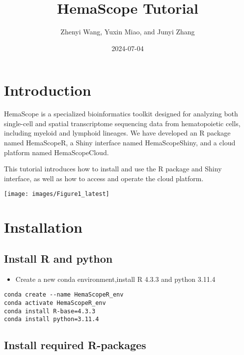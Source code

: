 \documentclass[
]{book}
\title{HemaScope Tutorial}
\author{Zhenyi Wang, Yuxin Miao, and Junyi Zhang}
\date{2024-07-04}
\providecommand{\tightlist}{%
  \setlength{\itemsep}{0pt}\setlength{\parskip}{0pt}}
\begin{document}
\maketitle

{
\setcounter{tocdepth}{1}
\tableofcontents
}
\hypertarget{introduction}{%
\chapter{Introduction}\label{introduction}}

HemaScope is a specialized bioinformatics toolkit designed for analyzing both single-cell and spatial transcriptome sequencing data from hematopoietic cells, including myeloid and lymphoid lineages. We have developed an R package named HemaScopeR, a Shiny interface named HemaScopeShiny, and a cloud platform named HemaScopeCloud.

This tutorial introduces how to install and use the R package and Shiny interface, as well as how to access and operate the cloud platform.

\texttt{[image: images/Figure1\_latest]}

\hypertarget{installation}{%
\chapter{Installation}\label{installation}}

\hypertarget{install-r-and-python}{%
\section{Install R and python}\label{install-r-and-python}}

\begin{itemize}
\tightlist
\item
  Create a new conda environment,install R 4.3.3 and python 3.11.4
\end{itemize}

\begin{verbatim}
conda create --name HemaScopeR_env
conda activate HemaScopeR_env
conda install R-base=4.3.3
conda install python=3.11.4
\end{verbatim}

\hypertarget{install-required-r-packages}{%
\section{Install required R-packages}\label{install-required-r-packages}}
\end{document}

